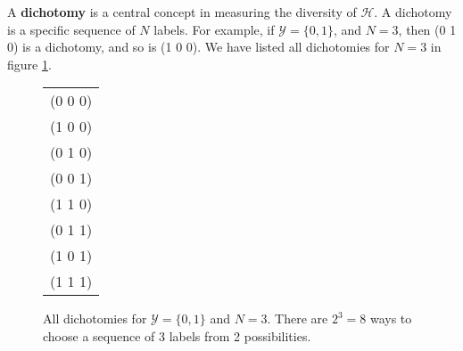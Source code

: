A \textbf{dichotomy} is a central concept in measuring the diversity of $\mathcal{H}$. A dichotomy is a specific sequence of $N$ labels. For example, if $\mathcal{Y} = \{0, 1\}$, and $N = 3$, then (0 1 0) is a dichotomy, and so is (1 0 0). We have listed all dichotomies for $N = 3$ in figure \ref{dichotomies}.

\begin{figure}[h]
	\begin{center}
			\begin{tabular}{c}
		(0 0 0) \\
		(1 0 0) \\
		(0 1 0) \\
		(0 0 1) \\
		(1 1 0) \\
		(0 1 1) \\
		(1 0 1) \\
		(1 1 1) \\
	\end{tabular}
	\end{center}
	\caption{All dichotomies for $\mathcal{Y} = \{0, 1\}$ and $N = 3$. There are $2^3 = 8$ ways to choose a sequence of 3 labels from 2 possibilities.}
	\label{dichotomies}
\end{figure}

